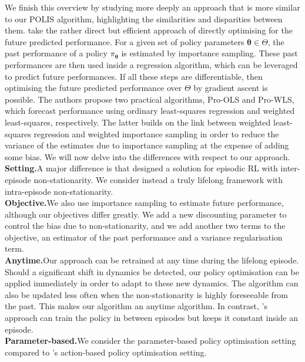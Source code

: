We finish this overview by studying more deeply an approach that is more similar to our POLIS algorithm, highlighting the similarities and disparities between them. 
\cite{chandak2020optimizing} take the rather direct but efficient approach of directly optimising for the future predicted performance. 
For a given set of policy parameters $\boldsymbol\theta\in\Theta$, the past performance of a policy $\pi_{\boldsymbol\theta}$ is estimated by importance sampling.
These past performances are then used inside a regression algorithm, which can be leveraged to predict future performances.
If all these steps are differentiable, then optimising the future predicted performance over $\Theta$ by gradient ascent is possible. 
The authors propose two practical algorithms, Pro-OLS and Pro-WLS, which forecast performance using ordinary least-squares regression and weighted least-squares, respectively. 
The latter builds on the link between weighted least-squares regression and weighted importance sampling \cite{hachiya2012importance,mahmood2014weighted} in order to reduce the variance of the estimates due to importance sampling at the expense of adding some bias.
We will now delve into the differences with respect to our approach.
\\
\noindent\textbf{Setting.}\indent A major difference is that \cite{chandak2020optimizing} designed a solution for episodic RL with inter-episode non-stationarity. We consider instead a truly lifelong framework with intra-episode non-stationarity.
\\
\noindent\textbf{Objective.}\indent We also use importance sampling to estimate future performance, although our objectives differ greatly. 
We add a new discounting parameter to control the bias due to non-stationarity, and we add another two terms to the objective, an estimator of the past performance and a variance regularisation term.
\\
\noindent\textbf{Anytime.}\indent Our approach can be retrained at any time during the lifelong episode. Should a significant shift in dynamics be detected, our policy optimisation can be applied immediately in order to adapt to these new dynamics. 
The algorithm can also be updated less often when the non-stationarity is highly foreseeable from the past. This makes our algorithm an anytime algorithm. In contrast, \cite{chandak2020optimizing}'s approach can train the policy in between episodes but keeps it constant inside an episode.
\\
\noindent\textbf{Parameter-based.}\indent We consider the parameter-based policy optimisation setting compared to \cite{chandak2020optimizing}'s action-based policy optimisation setting.\\
